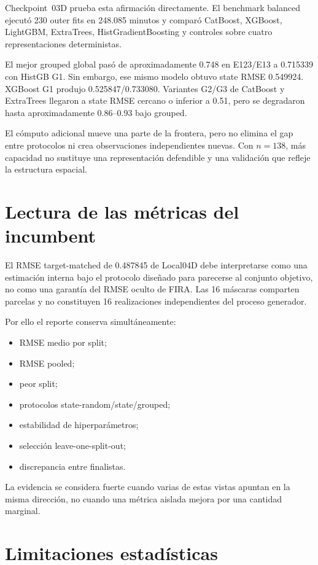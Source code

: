 Checkpoint~03D prueba esta afirmación directamente. El benchmark balanced ejecutó 230 outer
fits en 248.085 minutos y comparó CatBoost, XGBoost, LightGBM, ExtraTrees,
HistGradientBoosting y controles sobre cuatro representaciones deterministas.

El mejor grouped global pasó de aproximadamente 0.748 en E123/E13 a 0.715339 con HistGB G1.
Sin embargo, ese mismo modelo obtuvo state RMSE 0.549924. XGBoost G1 produjo
0.525847/0.733080. Variantes G2/G3 de CatBoost y ExtraTrees llegaron a state RMSE cercano o
inferior a 0.51, pero se degradaron hasta aproximadamente 0.86--0.93 bajo grouped.

El cómputo adicional mueve una parte de la frontera, pero no elimina el gap entre protocolos
ni crea observaciones independientes nuevas. Con $n=138$, más capacidad no sustituye una
representación defendible y una validación que refleje la estructura espacial.

\section{Lectura de las métricas del incumbent}

El RMSE target-matched de 0.487845 de Local04D debe interpretarse como una estimación interna bajo el
protocolo diseñado para parecerse al conjunto objetivo, no como una garantía del RMSE oculto
de FIRA. Las 16 máscaras comparten parcelas y no constituyen 16 realizaciones independientes
del proceso generador.

Por ello el reporte conserva simultáneamente:
\begin{itemize}
\item RMSE medio por split;
\item RMSE pooled;
\item peor split;
\item protocolos state-random/state/grouped;
\item estabilidad de hiperparámetros;
\item selección leave-one-split-out;
\item discrepancia entre finalistas.
\end{itemize}

La evidencia se considera fuerte cuando varias de estas vistas apuntan en la misma dirección,
no cuando una métrica aislada mejora por una cantidad marginal.

\section{Limitaciones estadísticas}

